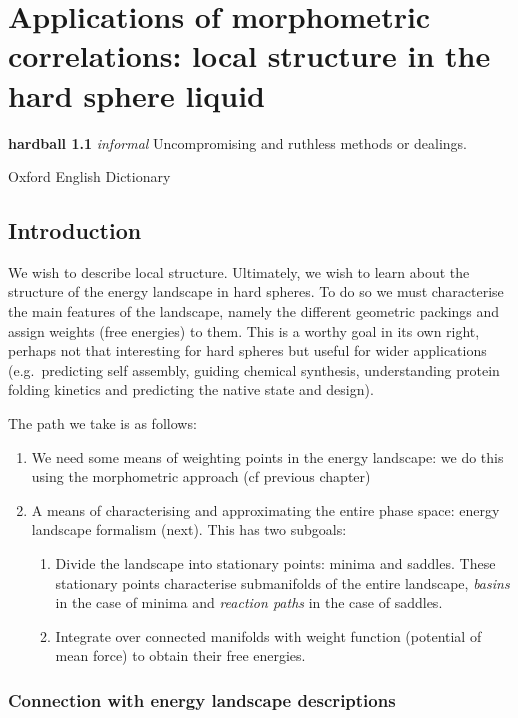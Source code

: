 \documentclass[11pt,twoside]{report}
\begin{document}
\chapter{Applications of morphometric correlations: local structure in the hard sphere liquid}
\epigraph{\textbf{hardball 1.1} \emph{informal} Uncompromising and ruthless methods or dealings.}{Oxford English Dictionary}

\section{Introduction}

We wish to describe local structure.
Ultimately, we wish to learn about the structure of the energy landscape in hard spheres.
To do so we must characterise the main features of the landscape, namely the different geometric packings and assign weights (free energies) to them.
This is a worthy goal in its own right, perhaps not that interesting for hard spheres but useful for wider applications (e.g.\ predicting self assembly, guiding chemical synthesis, understanding protein folding kinetics and predicting the native state and design).

The path we take is as follows:
\begin{enumerate}
\item We need some means of weighting points in the energy landscape: we do this using the morphometric approach (cf previous chapter)
\item A means of characterising and approximating the entire phase space: energy landscape formalism (next). This has two subgoals:
  \begin{enumerate}
  \item Divide the landscape into stationary points: minima and saddles.
    These stationary points characterise submanifolds of the entire landscape, \emph{basins} in the case of minima and \emph{reaction paths} in the case of saddles.
  \item Integrate over connected manifolds with weight function (potential of mean force) to obtain their free energies.
  \end{enumerate}
\end{enumerate}


\subsection{Connection with energy landscape descriptions}
\end{document}
